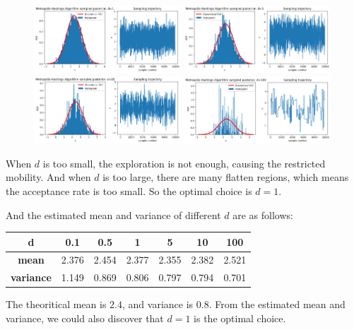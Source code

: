 \begin{homeworkProblem}
\begin{figure}[h]
    \includegraphics[width=0.49\textwidth]{./figure/p6/1.png}
    \includegraphics[width=0.49\textwidth]{./figure/p6/5.png}
    \includegraphics[width=0.49\textwidth]{./figure/p6/10.png}
    \includegraphics[width=0.49\textwidth]{./figure/p6/100.png}
\end{figure}
When $d$ is too small, the exploration is not enough, causing the restricted mobility. And when $d$ is too large, there are many flatten regions, which means the acceptance rate is too small. So the optimal choice is $d=1$.

And the estimated mean and variance of different $d$ are as follows:
\begin{table}[h]
    \centering
    \begin{tabular}{c cccccc}
    \toprule
    d & 0.1 & 0.5 & 1 & 5 & 10 & 100 \\
    \midrule
    \textbf{mean}     & 2.376 & 2.454 & 2.377 & 2.355 & 2.382 & 2.521 \\
    \textbf{variance} & 1.149 & 0.869 & 0.806 & 0.797 & 0.794 & 0.701 \\
    \bottomrule
    \end{tabular}
\end{table}

The theoritical mean is $2.4$, and variance is $0.8$. From the estimated mean and variance, we could also discover that $d=1$ is the optimal choice.

\end{homeworkProblem}

\newpage